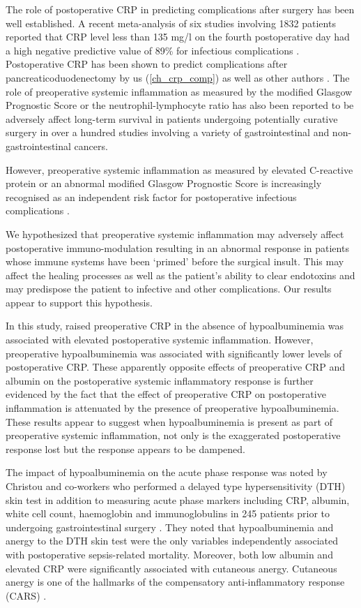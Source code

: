 The role of postoperative CRP in predicting complications after surgery has been well established. 
A recent meta-analysis of six studies involving 1832 patients reported that CRP level less than 135 mg/l on the fourth postoperative day had a high negative predictive value of 89\% for infectious complications \parencite{warschkow_safe_2012}. 
Postoperative CRP has been shown to predict complications after pancreaticoduodenectomy by us (\ref{ch_crp_comp}) as well as other authors \parencite{welsch_persisting_2008, hiyoshi_usefulness_2013, kosaka_multivariate_2014}.
The role of preoperative systemic inflammation as measured by the modified Glasgow Prognostic Score or the neutrophil-lymphocyte ratio has also been reported to be adversely affect long-term survival in patients undergoing potentially curative surgery in over a hundred studies involving a variety of gastrointestinal and non-gastrointestinal cancers. 

However, preoperative systemic inflammation as measured by elevated C-reactive protein or an abnormal modified Glasgow Prognostic Score is increasingly recognised as an independent risk factor for postoperative infectious complications \parencite{mohri_correlation_2014, kubo_elevated_2013, moyes_preoperative_2009}.

We hypothesized that preoperative systemic inflammation may adversely affect postoperative immuno-modulation resulting in an abnormal response in patients whose immune systems have been `primed' before the surgical insult. 
This may affect the healing processes as well as the patient's ability to clear endotoxins and may predispose the patient to infective and other complications.
Our results appear to support this hypothesis. 

In this study, raised preoperative CRP in the absence of hypoalbuminemia was associated with elevated postoperative systemic inflammation.
However, preoperative hypoalbuminemia was associated with significantly lower levels of postoperative CRP.
These apparently opposite effects of preoperative CRP and albumin on the postoperative systemic inflammatory response is further evidenced by the fact that the effect of preoperative CRP on postoperative inflammation is attenuated by the presence of preoperative hypoalbuminemia.
These results appear to suggest when hypoalbuminemia is present as part of preoperative systemic inflammation, not only is the exaggerated postoperative response lost but the response appears to be dampened. 

The impact of hypoalbuminemia on the acute phase response was noted by Christou and co-workers who performed a delayed type hypersensitivity (DTH) skin test in addition to measuring acute phase markers including CRP, albumin, white cell count, haemoglobin and immunoglobulins in 245 patients prior to undergoing gastrointestinal surgery \parencite{christou_estimating_1989}.
They noted that hypoalbuminemia and anergy to the DTH skin test were the only variables independently associated with postoperative sepsis-related mortality.
Moreover, both low albumin and elevated CRP were significantly associated with cutaneous anergy.
Cutaneous anergy is one of the hallmarks of the compensatory anti-inflammatory response (CARS) \parencite{ward_compensatory_2008}.

